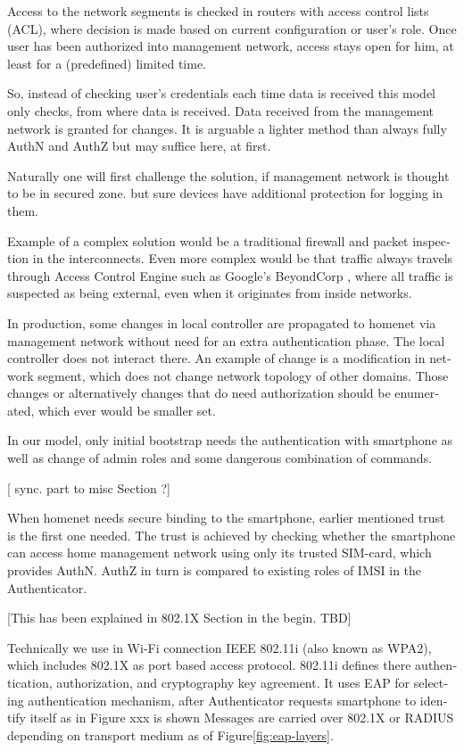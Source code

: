 \documentclass[12pt,a4paper,english]{tutthesis}
\begin{document}
\begin{otherlanguage}{english}
Access to the network segments is checked in routers with access control lists
(ACL), where decision is made based on current configuration or user's
role.  Once user has been authorized into management network, access
stays open for him, at least for a (predefined) limited time.

So, instead of checking user's credentials each time data is received
this model only checks, from where data is received. 
Data received from the management network is granted for changes.
It is arguable a lighter method than always
fully AuthN and AuthZ but may suffice here, at first.

Naturally one will first challenge the solution, if
management network is thought to be in secured zone.
but sure devices have additional protection for logging in them. 


Example of a complex solution would be a traditional firewall and packet
inspection in the interconnects. Even more complex would be that traffic
always travels through Access Control Engine such as Google's
BeyondCorp \cite{2014-beyondcorp}, where all
traffic is suspected as being external, even when it originates from inside networks.


In production, some changes in local controller are propagated to homenet
via management network without need for an extra authentication phase.
The local controller does not interact there. An example of change is
a modification in network segment, which does not change network topology of other domains.
Those changes or alternatively changes that do need authorization
should be enumerated, which ever would be smaller set.  

In our model, only initial bootstrap needs the authentication with
smartphone as well as change of admin roles and some dangerous
combination of commands.

[ sync. part to misc Section ?]





When homenet needs secure binding to the smartphone, earlier
mentioned trust is the first one needed.  The trust is achieved by
checking whether the smartphone can access home management
network using only its trusted SIM-card, which provides AuthN. AuthZ in
turn is compared to existing roles of IMSI in the Authenticator.


[This has been explained in 802.1X Section in the begin. TBD]

Technically we use in Wi-Fi connection IEEE 802.11i (also known as WPA2), which includes
802.1X as port based access protocol.  802.11i defines there
authentication, authorization, and cryptography key agreement.
 It uses EAP for selecting authentication 
mechanism, after Authenticator requests smartphone to identify itself as in Figure xxx is shown
Messages are carried over 802.1X or RADIUS depending on transport
medium as of Figure\ref{fig:eap-layers}.



\end{otherlanguage}
\end{document}
